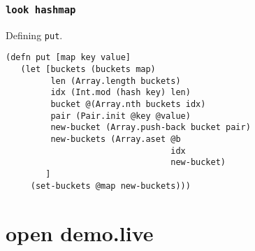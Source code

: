 \documentclass{beamer}
\begin{document}
  \begin{frame}[fragile]
    \frametitle{\texttt{look hashmap}}
    \begin{listing}[H]
      \caption{Defining \texttt{put}.}
      \begin{verbatim}
(defn put [map key value]
   (let [buckets (buckets map)
         len (Array.length buckets)
         idx (Int.mod (hash key) len)
         bucket @(Array.nth buckets idx)
         pair (Pair.init @key @value)
         new-bucket (Array.push-back bucket pair)
         new-buckets (Array.aset @b
                                 idx
                                 new-bucket)
        ]
     (set-buckets @map new-buckets)))
      \end{verbatim}
    \end{listing}
  \end{frame}
  \section{open demo.live}
\end{document}
